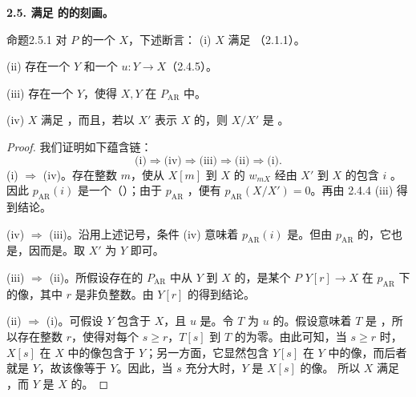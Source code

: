 \textbf{2.5. 满足 的的刻画。}
\begin{SGAresult}{命题}{2.5.1}
对 $P$ 的一个 $X$，下述断言：
(i) $X$ 满足 （2.1.1）。

(ii) 存在一个 $Y$ 和一个  $u:Y\to X$（2.4.5）。

(iii) 存在一个 $Y$，使得 $X,Y$ 在 $P_{\mathrm{AR}}$ 中。

(iv) $X$ 满足 ，而且，若以 $X'$ 表示 $X$ 的，则 $X/X'$ 是 。
\end{SGAresult}
\begin{proof}我们证明如下蕴含链：
\[
\text{(i)}\Rightarrow\text{(iv)}\Rightarrow\text{(iii)}\Rightarrow\text{(ii)}\Rightarrow\text{(i)}.
\]
(i) $\Rightarrow$ (iv)。存在整数 $m$，使从 $X[m]$ 到 $X$ 的 $w_{mX}$ 经由 $X'$ 到 $X$ 的包含 $i$ 。因此 $p_{\mathrm{AR}}(i)$ 是一个（）；由于 $p_{\mathrm{AR}}$ ，便有 $p_{\mathrm{AR}}(X/X')=0$。再由 2.4.4 (iii) 得到结论。

(iv) $\Rightarrow$ (iii)。沿用上述记号，条件 (iv) 意味着 $p_{\mathrm{AR}}(i)$ 是。但由 $p_{\mathrm{AR}}$ 的，它也是，因而是。取 $X'$ 为 $Y$ 即可。

(iii) $\Rightarrow$ (ii)。所假设存在的 $P_{\mathrm{AR}}$ 中从 $Y$ 到 $X$ 的，是某个 $P$  $Y[r]\to X$ 在 $p_{\mathrm{AR}}$ 下的像，其中 $r$ 是非负整数。由 $Y[r]$ 的得到结论。

(ii) $\Rightarrow$ (i)。可假设 $Y$ 包含于 $X$，且 $u$ 是。令 $T$ 为 $u$ 的。假设意味着 $T$ 是 ，所以存在整数 $r$，使得对每个 $s\geq r$，$T[s]$ 到 $T$ 的为零。由此可知，当 $s\geq r$ 时，$X[s]$ 在 $X$ 中的像包含于 $Y$；另一方面，它显然包含 $Y[s]$ 在 $Y$ 中的像，而后者就是 $Y$，故该像等于 $Y$。因此，当 $s$ 充分大时，$Y$ 是 $X[s]$ 的像。
所以 $X$ 满足 ，而 $Y$ 是 $X$ 的。
\end{proof}

